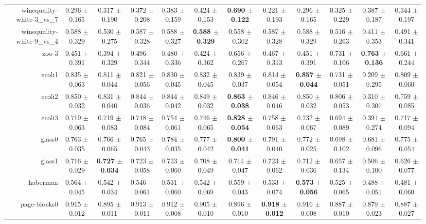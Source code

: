 \begin{table}[!ht]
{\begin{tabular}{r c c c c c c c c c c c}
winequality-white-3\_vs\_7 & 0.296 $\pm$ 0.165 & 0.317 $\pm$ 0.190 & 0.372 $\pm$ 0.208 & 0.383 $\pm$ 0.159 & 0.424 $\pm$ 0.153 & \textbf{0.690 $\pm$ 0.122} & 0.221 $\pm$ 0.193 & 0.296 $\pm$ 0.165 & 0.325 $\pm$ 0.229 & 0.387 $\pm$ 0.187 & 0.344 $\pm$ 0.197 \\
winequality-white-9\_vs\_4 & 0.588 $\pm$ 0.329 & 0.530 $\pm$ 0.275 & 0.587 $\pm$ 0.328 & 0.588 $\pm$ 0.327 & \textbf{0.588 $\pm$ 0.329} & 0.558 $\pm$ 0.302 & 0.587 $\pm$ 0.328 & 0.588 $\pm$ 0.329 & 0.516 $\pm$ 0.263 & 0.411 $\pm$ 0.353 & 0.491 $\pm$ 0.341 \\
zoo-3 & 0.451 $\pm$ 0.391 & 0.394 $\pm$ 0.329 & 0.496 $\pm$ 0.344 & 0.480 $\pm$ 0.336 & 0.424 $\pm$ 0.362 & 0.656 $\pm$ 0.267 & 0.467 $\pm$ 0.313 & 0.451 $\pm$ 0.391 & 0.731 $\pm$ 0.106 & \textbf{0.763 $\pm$ 0.136} & 0.661 $\pm$ 0.244 \\
ecoli1 & 0.835 $\pm$ 0.063 & 0.811 $\pm$ 0.044 & 0.821 $\pm$ 0.056 & 0.830 $\pm$ 0.045 & 0.832 $\pm$ 0.045 & 0.839 $\pm$ 0.037 & 0.814 $\pm$ 0.054 & \textbf{0.857 $\pm$ 0.044} & 0.731 $\pm$ 0.051 & 0.209 $\pm$ 0.295 & 0.809 $\pm$ 0.060 \\
ecoli2 & 0.850 $\pm$ 0.032 & 0.831 $\pm$ 0.040 & 0.844 $\pm$ 0.036 & 0.844 $\pm$ 0.042 & 0.849 $\pm$ 0.032 & \textbf{0.863 $\pm$ 0.038} & 0.846 $\pm$ 0.046 & 0.850 $\pm$ 0.032 & 0.806 $\pm$ 0.053 & 0.310 $\pm$ 0.307 & 0.759 $\pm$ 0.085 \\
ecoli3 & 0.719 $\pm$ 0.063 & 0.719 $\pm$ 0.083 & 0.748 $\pm$ 0.084 & 0.754 $\pm$ 0.061 & 0.746 $\pm$ 0.065 & \textbf{0.828 $\pm$ 0.054} & 0.758 $\pm$ 0.063 & 0.732 $\pm$ 0.067 & 0.694 $\pm$ 0.089 & 0.391 $\pm$ 0.274 & 0.717 $\pm$ 0.094 \\
glass0 & 0.763 $\pm$ 0.035 & 0.766 $\pm$ 0.065 & 0.765 $\pm$ 0.043 & 0.784 $\pm$ 0.035 & 0.777 $\pm$ 0.042 & \textbf{0.800 $\pm$ 0.041} & 0.791 $\pm$ 0.040 & 0.772 $\pm$ 0.025 & 0.698 $\pm$ 0.102 & 0.681 $\pm$ 0.096 & 0.775 $\pm$ 0.054 \\
glass1 & 0.716 $\pm$ 0.029 & \textbf{0.727 $\pm$ 0.034} & 0.723 $\pm$ 0.058 & 0.723 $\pm$ 0.060 & 0.708 $\pm$ 0.049 & 0.714 $\pm$ 0.047 & 0.723 $\pm$ 0.062 & 0.712 $\pm$ 0.036 & 0.657 $\pm$ 0.134 & 0.506 $\pm$ 0.100 & 0.626 $\pm$ 0.077 \\
haberman & 0.564 $\pm$ 0.045 & 0.542 $\pm$ 0.034 & 0.546 $\pm$ 0.061 & 0.531 $\pm$ 0.060 & 0.542 $\pm$ 0.069 & 0.559 $\pm$ 0.043 & 0.533 $\pm$ 0.074 & \textbf{0.573 $\pm$ 0.056} & 0.525 $\pm$ 0.065 & 0.488 $\pm$ 0.051 & 0.481 $\pm$ 0.060 \\
page-blocks0 & 0.915 $\pm$ 0.012 & 0.895 $\pm$ 0.011 & 0.913 $\pm$ 0.011 & 0.912 $\pm$ 0.008 & 0.905 $\pm$ 0.010 & 0.896 $\pm$ 0.010 & \textbf{0.918 $\pm$ 0.012} & 0.916 $\pm$ 0.008 & 0.887 $\pm$ 0.010 & 0.879 $\pm$ 0.023 & 0.887 $\pm$ 0.027 \\

\end{tabular}}
\end{table}
